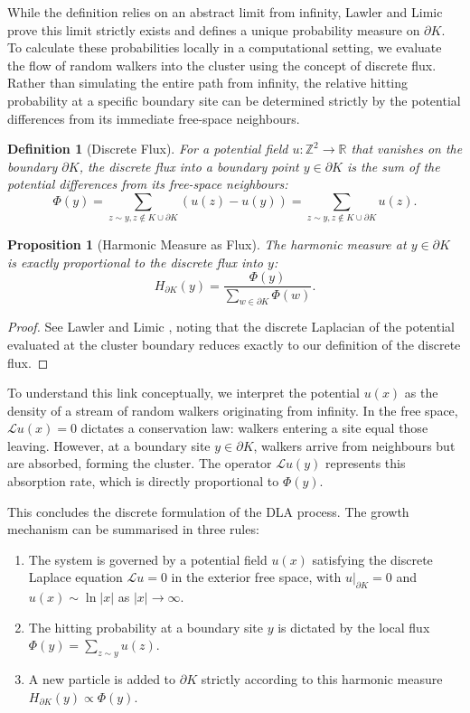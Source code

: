 \documentclass[12pt, a4paper, oneside]{report}
\newtheorem{definition}[theorem]{Definition}
\newtheorem{proposition}[theorem]{Proposition}
\theoremstyle{remark}
\begin{document}
While the definition relies on an abstract limit from infinity, Lawler and Limic \cite[Proposition 6.6.1]{Lawler2010} prove this limit strictly exists and defines a unique probability measure on $\partial K$. To calculate these probabilities locally in a computational setting, we evaluate the flow of random walkers into the cluster using the concept of discrete flux. Rather than simulating the entire path from infinity, the relative hitting probability at a specific boundary site can be determined strictly by the potential differences from its immediate free-space neighbours.
\begin{definition}[Discrete Flux]
For a potential field $u: \mathbb{Z}^2 \to \mathbb{R}$ that vanishes on the boundary $\partial K$, the discrete flux into a boundary point $y \in \partial K$ is the sum of the potential differences from its free-space neighbours:
\begin{equation*}
    \Phi(y) = \sum_{z \sim y, z \notin K \cup \partial K} (u(z) - u(y)) = \sum_{z \sim y, z \notin K \cup \partial K} u(z).
\end{equation*}
\end{definition}

\begin{proposition}[Harmonic Measure as Flux]
The harmonic measure at $y \in \partial K$ is exactly proportional to the discrete flux into $y$:
\begin{equation*}
    H_{\partial K}(y) = \frac{\Phi(y)}{\sum_{w \in \partial K} \Phi(w)}.
\end{equation*}
\end{proposition}
\begin{proof}
See Lawler and Limic \cite[Proposition 6.6.1]{Lawler2010}, noting that the discrete Laplacian of the potential evaluated at the cluster boundary reduces exactly to our definition of the discrete flux.
\end{proof}

To understand this link conceptually, we interpret the potential $u(x)$ as the density of a stream of random walkers originating from infinity. In the free space, $\mathcal{L}u(x) = 0$ dictates a conservation law: walkers entering a site equal those leaving. However, at a boundary site $y \in \partial K$, walkers arrive from neighbours but are absorbed, forming the cluster. The operator $\mathcal{L}u(y)$ represents this absorption rate, which is directly proportional to $\Phi(y)$.

This concludes the discrete formulation of the DLA process. The growth mechanism can be summarised in three rules:
\begin{enumerate}
    \item The system is governed by a potential field $u(x)$ satisfying the discrete Laplace equation $\mathcal{L}u=0$ in the exterior free space, with $u|_{\partial K} = 0$ and $u(x) \sim \ln|x|$ as $|x| \to \infty$.
    \item The hitting probability at a boundary site $y$ is dictated by the local flux $\Phi(y) = \sum_{z \sim y} u(z)$.
    \item A new particle is added to $\partial K$ strictly according to this harmonic measure $H_{\partial K}(y) \propto \Phi(y)$.
\end{enumerate}
\end{document}
